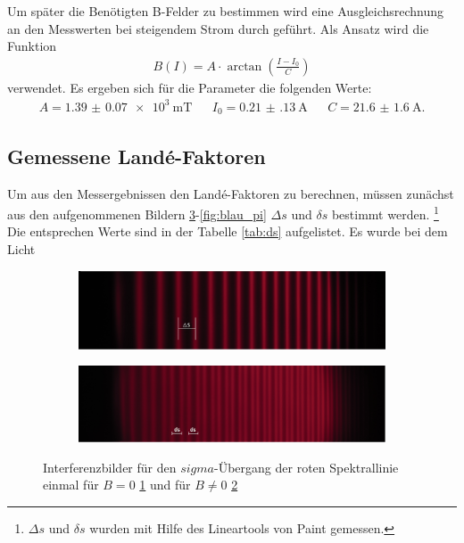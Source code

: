 Um später die Benötigten B-Felder zu bestimmen wird eine Ausgleichsrechnung
an den Messwerten bei steigendem Strom durch geführt.
Als Ansatz wird die Funktion
\begin{align}
B(I)=A \cdot \arctan(\frac{I-I_0}{C}) \label{eqn:hyst}
\end{align}
verwendet.
Es ergeben sich für die Parameter die folgenden Werte:
\begin{align}
  A=\SI{1.39(7)e3}{\milli\tesla}&   &I_0=\SI{0.21(13)}{\ampere}&  &C=\SI{21.6(16)}{\ampere}.
\end{align}

\subsection{Gemessene Landé-Faktoren}
Um aus den Messergebnissen den
Landé-Faktoren zu berechnen, müssen zunächst aus den
aufgenommenen Bildern \ref{fig:rot}-\ref{fig:blau_pi} $\Delta s$ und $\delta s$ bestimmt werden.
\footnote{$\Delta s$ und $\delta s$ wurden mit Hilfe des Lineartools von Paint gemessen.}
Die entsprechen Werte sind in der Tabelle \ref{tab:ds}
aufgelistet. Es wurde bei dem  Licht

\begin{figure}
   \centering
   \begin{subfigure}{0.9\textwidth}
     \centering
     \includegraphics[width=1\textwidth]{rot_sigma_B=0.jpg}
     \caption{}
     \label{fig:rotB=0}
   \end{subfigure}
   \begin{subfigure}{0.9\textwidth}
     \centering
     \includegraphics[width=1\textwidth]{rot_sigma_B=!0.jpg}
     \caption{}
     \label{fig:rotB=!0}
   \end{subfigure}
\caption{Interferenzbilder für den $sigma$-Übergang  der roten Spektrallinie einmal für $B=0$ \ref{fig:rotB=0} und für $B\neq0$ \ref{fig:rotB=!0}}
\label{fig:rot}
\end{figure}
\FloatBarrier
